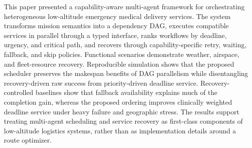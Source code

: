 \documentclass[conference]{IEEEtran}
\begin{document}
This paper presented a capability-aware multi-agent framework for
orchestrating heterogeneous low-altitude emergency medical delivery
services. The system transforms mission semantics into a dependency DAG,
executes compatible services in parallel through a typed interface, ranks
workflows by deadline, urgency, and critical path, and recovers through
capability-specific retry, waiting, fallback, and skip policies. Functional
scenarios demonstrate weather, airspace, and fleet-resource recovery.
Reproducible simulation shows that the proposed scheduler preserves the
makespan benefits of DAG parallelism while disentangling recovery-driven
raw success from priority-driven deadline service. Recovery-controlled
baselines show that fallback availability explains much of the completion
gain, whereas the proposed ordering improves clinically weighted deadline
service under heavy failure and geographic stress.
The results support treating multi-agent scheduling and service recovery as
first-class components of low-altitude logistics systems, rather than as
implementation details around a route optimizer.



\end{document}
